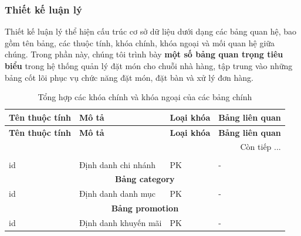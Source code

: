 \subsubsection{Thiết kế luận lý}

Thiết kế luận lý thể hiện cấu trúc cơ sở dữ liệu dưới dạng các bảng quan hệ, bao gồm tên bảng, các thuộc tính, khóa chính, khóa ngoại và mối quan hệ giữa chúng. Trong phần này, chúng tôi trình bày \textbf{một số bảng quan trọng tiêu biểu} trong hệ thống quản lý đặt món cho chuỗi nhà hàng, tập trung vào những bảng cốt lõi phục vụ chức năng đặt món, đặt bàn và xử lý đơn hàng.

\begin{longtable}{|l|p{6cm}|l|l|}
	\caption{Tổng hợp các khóa chính và khóa ngoại của các bảng chính}
	\hline
	\textbf{Tên thuộc tính} & \textbf{Mô tả}                                 & \textbf{Loại khóa} & \textbf{Bảng liên quan} \\
	\hline
	\endfirsthead

	\hline
	\textbf{Tên thuộc tính} & \textbf{Mô tả}                                 & \textbf{Loại khóa} & \textbf{Bảng liên quan} \\
	\hline
	\endhead

	\hline \multicolumn{4}{|r|}{{Còn tiếp ...}}                                                                             \\
	\hline
	\endfoot

	\hline
	\endlastfoot

	\multicolumn{4}{|c|}{\textbf{Bảng branch}}                                                                              \\
	\hline
	id                      & Định danh chi nhánh                            & PK                 & -                       \\
	\hline

	\multicolumn{4}{|c|}{\textbf{Bảng category}}                                                                            \\
	\hline
	id                      & Định danh danh mục                             & PK                 & -                       \\
	\hline

	\multicolumn{4}{|c|}{\textbf{Bảng promotion}}                                                                           \\
	\hline
	id                      & Định danh khuyến mãi                           & PK                 & -                       \\
	\hline


\end{longtable}
